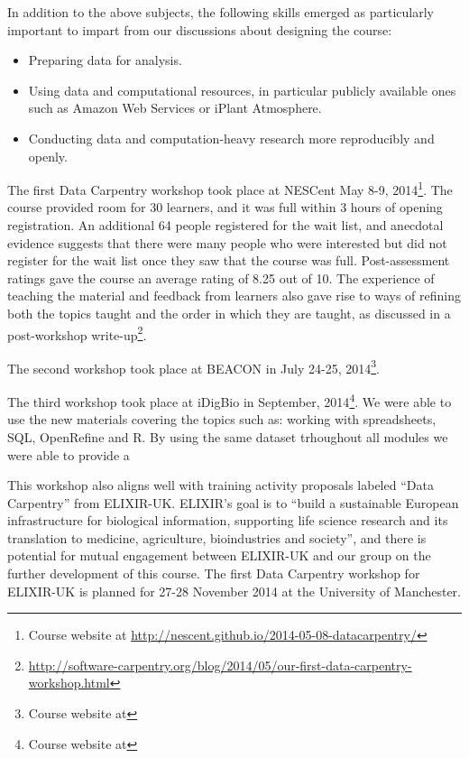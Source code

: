 \documentclass[15]{idcc}
\begin{document}
In addition to the above subjects, the following skills emerged as
particularly important to impart from our discussions about designing
the course:
\begin{itemize}
\item Preparing data for analysis.
\item Using data and computational resources, in particular publicly available ones such as Amazon Web Services or iPlant Atmosphere.
\item Conducting data and computation-heavy research more reproducibly and openly.
\end{itemize}




The first Data Carpentry workshop took place at NESCent May 8-9, 2014\footnote{Course website at \url{http://nescent.github.io/2014-05-08-datacarpentry/}}. The course provided room for 30 learners, and it was full within 3 hours of opening registration. An additional 64 people registered for the wait list, and anecdotal evidence suggests that there were many people who were interested but did not register for the wait list once they saw that the course was full. Post-assessment ratings gave the course an average rating of 8.25 out of 10. The experience of teaching the material and feedback from learners also gave rise to ways of refining both the topics taught and the order in which they are taught, as discussed in a post-workshop write-up\footnote{\url{http://software-carpentry.org/blog/2014/05/our-first-data-carpentry-workshop.html}}.

The second workshop took place at BEACON in July 24-25, 2014\footnote{Course website at}. 

The third workshop took place at iDigBio in September, 2014\footnote{Course website at}. We were able to use the new materials covering the topics such as: working with spreadsheets, SQL, OpenRefine and R. By using the same dataset trhoughout all modules we were able to provide a 

This workshop also aligns well with training activity proposals labeled ``Data Carpentry'' from ELIXIR-UK. ELIXIR's goal is to ``build a sustainable European infrastructure for biological information, supporting life science research and its translation to medicine, agriculture, bioindustries and society'', and there is potential for mutual engagement between ELIXIR-UK and our group on the further development of this course. The first Data Carpentry workshop for ELIXIR-UK is planned for 27-28 November 2014 at the University of Manchester.
\end{document}
